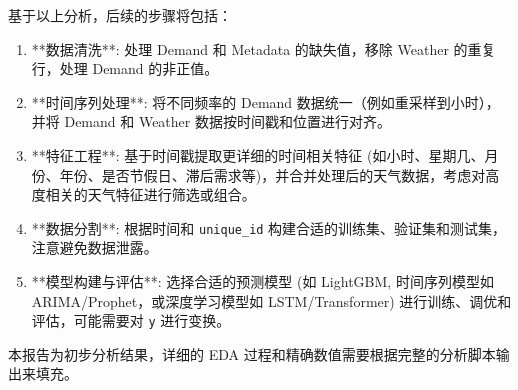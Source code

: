 \documentclass{article} %
\begin{document}
基于以上分析，后续的步骤将包括：
\begin{enumerate}
    \item **数据清洗**: 处理 Demand 和 Metadata 的缺失值，移除 Weather 的重复行，处理 Demand 的非正值。
    \item **时间序列处理**: 将不同频率的 Demand 数据统一（例如重采样到小时），并将 Demand 和 Weather 数据按时间戳和位置进行对齐。
    \item **特征工程**: 基于时间戳提取更详细的时间相关特征 (如小时、星期几、月份、年份、是否节假日、滞后需求等)，并合并处理后的天气数据，考虑对高度相关的天气特征进行筛选或组合。
    \item **数据分割**: 根据时间和 \texttt{unique\_id} 构建合适的训练集、验证集和测试集，注意避免数据泄露。
    \item **模型构建与评估**: 选择合适的预测模型 (如 LightGBM, 时间序列模型如 ARIMA/Prophet，或深度学习模型如 LSTM/Transformer) 进行训练、调优和评估，可能需要对 \texttt{y} 进行变换。
\end{enumerate}

本报告为初步分析结果，详细的 EDA 过程和精确数值需要根据完整的分析脚本输出来填充。
\end{document}
